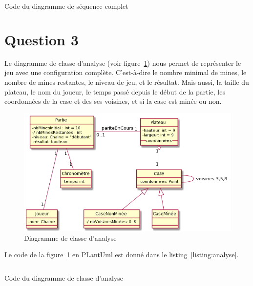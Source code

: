 \documentclass[a4paper,12pt]{article}
\begin{document}
\begin{listing}[ht]
    \inputminted[bgcolor=lightgray!40,linenos=true]{fsharp}{./code-images/q2-c}
    \caption{Code du diagramme de séquence complet}
    \label{listing:seqc}
\end{listing}

\clearpage

\section{Question 3}\label{question-3}

Le diagramme de classe d'analyse (voir figure~\ref{fig:analyse}) nous permet de représenter le jeu avec une configuration complète. C'est-à-dire le nombre minimal de mines, le nombre de mines restantes, le niveau de jeu, et le résultat. Mais aussi, la taille du plateau, le nom du joueur, le temps passé depuis le début de la partie, les coordonnées de la case et des ses voisines, et si la case est minée ou non.

\begin{figure}[htbp]
    \centering
    \includegraphics[width=1\textwidth]{./images/q3-Analyse.png}
    \caption{Diagramme de classe d'analyse}
    \label{fig:analyse}
\end{figure}


Le code de la figure~\ref{fig:analyse} en PLantUml est donné dans le listing~\ref{listing:analyse}.

\begin{listing}[ht]
    \inputminted[bgcolor=lightgray!40,linenos=true]{fsharp}{./code-images/q3-Analyse}
    \caption{Code du diagramme de classe d'analyse}
    \label{listing:analyse}
\end{listing}

\clearpage
\end{document}
